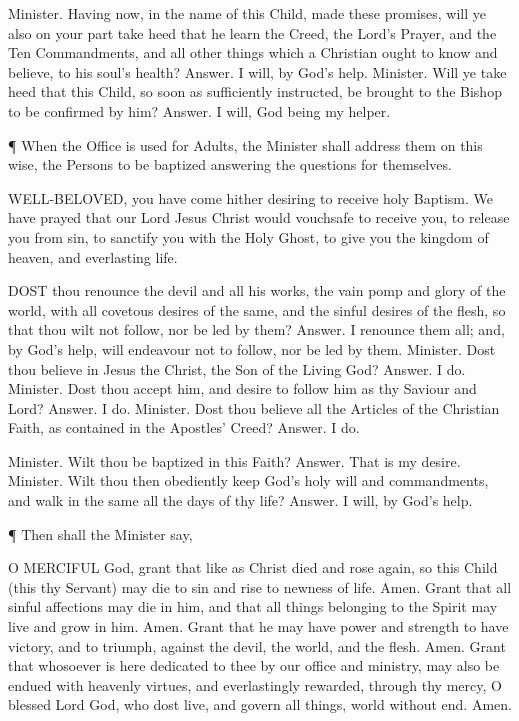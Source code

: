     Minister. Having now, in the name of this Child, made these promises, will ye also on your part take heed that he learn the Creed, the Lord’s Prayer, and the Ten Commandments, and all other things which a Christian ought to know and believe, to his soul’s health?
    Answer. I will, by God’s help.
    Minister. Will ye take heed that this Child, so soon as sufficiently instructed, be brought to the Bishop to be confirmed by him?
    Answer. I will, God being my helper.
 

 
¶ When the Office is used for Adults, the Minister shall address them on this wise, the Persons to be baptized answering the questions for themselves.

WELL-BELOVED, you have come hither desiring to receive holy Baptism. We have prayed that our Lord Jesus Christ would vouchsafe to receive you, to release you from sin, to sanctify you with the Holy Ghost, to give you the kingdom of heaven, and everlasting life.

DOST thou renounce the devil and all his works, the vain pomp and glory of the world, with all covetous desires of the same, and the sinful desires of the flesh, so that thou wilt not follow, nor be led by them? 
    Answer. I renounce them all; and, by God's help, will endeavour not to follow, nor be led by them.
    Minister. Dost thou believe in Jesus the Christ, the Son of the Living God?
    Answer. I do.
    Minister. Dost thou accept him, and desire to follow him as thy Saviour and Lord?
    Answer. I do.
    Minister. Dost thou believe all the Articles of the Christian Faith, as contained in the Apostles' Creed?
    Answer. I do.

    Minister. Wilt thou be baptized in this Faith?
    Answer. That is my desire.
    Minister. Wilt thou then obediently keep God's holy will and commandments, and walk in the same all the days of thy life?
    Answer. I will, by God's help. 
 

 
¶ Then shall the Minister say, 

O MERCIFUL God, grant that like as Christ died and rose again, so this Child (this thy Servant) may die to sin and rise to newness of life. Amen.
    Grant that all sinful affections may die in him, and that all things belonging to the Spirit may live and grow in him. Amen.
    Grant that he may have power and strength to have victory, and to triumph, against the devil, the world, and the flesh. Amen.
    Grant that whosoever is here dedicated to thee by our office and ministry, may also be endued with heavenly virtues, and everlastingly rewarded, through thy mercy, O blessed Lord God, who dost live, and govern all things, world without end. Amen.
 

